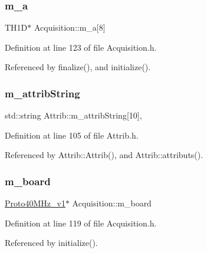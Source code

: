 \subsubsection{\texorpdfstring{m\+\_\+a}{m\_a}}
{\footnotesize\ttfamily T\+H1D$\ast$ Acquisition\+::m\+\_\+a\mbox{[}8\mbox{]}\hspace{0.3cm}{\ttfamily [private]}}



Definition at line 123 of file Acquisition.\+h.



Referenced by finalize(), and initialize().

\mbox{\label{classAttrib_a3414521d7a82476e874b25a5407b5e63}} 
\subsubsection{\texorpdfstring{m\+\_\+attrib\+String}{m\_attribString}}
{\footnotesize\ttfamily std\+::string Attrib\+::m\+\_\+attrib\+String\mbox{[}10\mbox{]}\hspace{0.3cm}{\ttfamily [protected]}, {\ttfamily [inherited]}}



Definition at line 105 of file Attrib.\+h.



Referenced by Attrib\+::\+Attrib(), and Attrib\+::attributs().

\mbox{\label{classAcquisition_a9b0db99be79d61ae78dae8a9e4efceab}} 
\subsubsection{\texorpdfstring{m\+\_\+board}{m\_board}}
{\footnotesize\ttfamily \hyperlink{classProto40MHz__v1}{Proto40\+M\+Hz\+\_\+v1}$\ast$ Acquisition\+::m\+\_\+board\hspace{0.3cm}{\ttfamily [private]}}



Definition at line 119 of file Acquisition.\+h.



Referenced by initialize().

